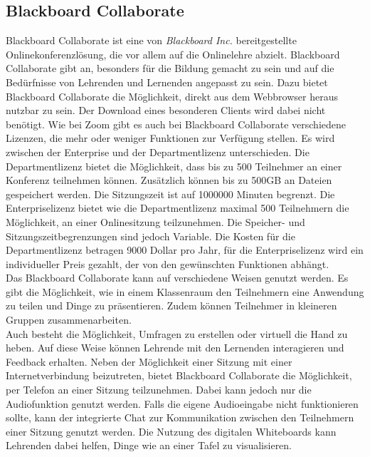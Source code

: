 \subsection{Blackboard Collaborate}
Blackboard Collaborate ist eine von \textit{Blackboard Inc.} bereitgestellte Onlinekonferenzlösung, die vor allem auf die Onlinelehre abzielt.
\autocite[Vgl.][]{M_Blackboard.o.J.}
Blackboard Collaborate gibt an, besonders für die Bildung gemacht zu sein und auf die Bedürfnisse von Lehrenden und Lernenden angepasst zu sein.
Dazu bietet Blackboard Collaborate die Möglichkeit, direkt aus dem Webbrowser heraus nutzbar zu sein.
Der Download eines besonderen Clients wird dabei nicht benötigt.
Wie bei Zoom gibt es auch bei Blackboard Collaborate verschiedene Lizenzen, die mehr oder weniger Funktionen zur Verfügung stellen.
Es wird zwischen der Enterprise und der Departmentlizenz unterschieden.
Die Departmentlizenz bietet die Möglichkeit, dass bis zu 500 Teilnehmer an einer Konferenz teilnehmen können.
Zusätzlich können bis zu 500GB an Dateien gespeichert werden. Die Sitzungszeit ist auf 1000000 Minuten begrenzt.
Die Enterpriselizenz bietet wie die Departmentlizenz maximal 500 Teilnehmern die Möglichkeit, an einer Onlinesitzung teilzunehmen.
Die Speicher- und Sitzungszeitbegrenzungen sind jedoch Variable.
Die Kosten für die Departmentlizenz betragen 9000 Dollar pro Jahr, für die Enterpriselizenz wird ein individueller Preis gezahlt, der von den gewünschten Funktionen abhängt.
\autocite[Vgl.][]{M_Blackboard.o.J.}
\\
Das Blackboard Collaborate kann auf verschiedene Weisen genutzt werden.
Es gibt die Möglichkeit, wie in einem Klassenraum den Teilnehmern eine Anwendung zu teilen und Dinge zu präsentieren.
Zudem können Teilnehmer in kleineren Gruppen zusammenarbeiten.
\autocite[Vgl.][]{M_Blackboard.o.J.}
\\
Auch besteht die Möglichkeit, Umfragen zu erstellen oder virtuell die Hand zu heben.
Auf diese Weise können Lehrende mit den Lernenden interagieren und Feedback erhalten.
Neben der Möglichkeit einer Sitzung mit einer Internetverbindung beizutreten, bietet Blackboard Collaborate die Möglichkeit, per Telefon an einer Sitzung teilzunehmen.
Dabei kann jedoch nur die Audiofunktion genutzt werden.
Falls die eigene Audioeingabe nicht funktionieren sollte, kann der integrierte Chat zur Kommunikation zwischen den Teilnehmern einer Sitzung genutzt werden.
Die Nutzung des digitalen Whiteboards kann Lehrenden dabei helfen, Dinge wie an einer Tafel zu visualisieren.
\autocite[Vgl.][]{M_NorthernIllinoisUniversity.o.J.}

